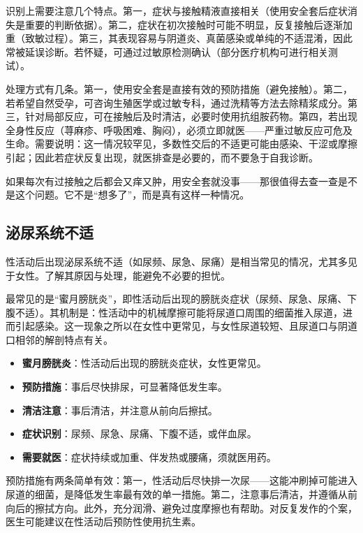 \documentclass[12pt,UTF8]{ctexbook}
\begin{document}
识别上需要注意几个特点。第一，症状与接触精液直接相关（使用安全套后症状消失是重要的判断依据）。第二，症状在初次接触时可能不明显，反复接触后逐渐加重（致敏过程）。第三，其表现容易与阴道炎、真菌感染或单纯的不适混淆，因此常被延误诊断。若怀疑，可通过过敏原检测确认（部分医疗机构可进行相关测试）。

处理方式有几条。第一，使用安全套是直接有效的预防措施（避免接触）。第二，若希望自然受孕，可咨询生殖医学或过敏专科，通过洗精等方法去除精浆成分。第三，针对局部反应，可在接触后及时清洁，必要时使用抗组胺药物。第四，若出现全身性反应（荨麻疹、呼吸困难、胸闷），必须立即就医——严重过敏反应可危及生命。需要说明：这一情况较罕见，多数性交后的不适更可能由感染、干涩或摩擦引起；因此若症状反复出现，就医排查是必要的，而不要急于自我诊断。

\begin{tcolorbox}[colback=pink!5!white,colframe=red!50!black,title=贴心小叮咛]
	如果每次有过接触之后都会又痒又肿，用安全套就没事——那很值得去查一查是不是这个问题。它不是“想多了”，而是真有这样一种情况。
\end{tcolorbox}

\subsection{泌尿系统不适}

性活动后出现泌尿系统不适（如尿频、尿急、尿痛）是相当常见的情况，尤其多见于女性。了解其原因与处理，能避免不必要的担忧。

最常见的是“蜜月膀胱炎”，即性活动后出现的膀胱炎症状（尿频、尿急、尿痛、下腹不适）。其机制是：性活动中的机械摩擦可能将尿道口周围的细菌推入尿道，进而引起感染。这一现象之所以在女性中更常见，与女性尿道较短、且尿道口与阴道口相邻的解剖特点有关。

\begin{itemize}
	\item \textbf{蜜月膀胱炎}：性活动后出现的膀胱炎症状，女性更常见。
	\item \textbf{预防措施}：事后尽快排尿，可显著降低发生率。
	\item \textbf{清洁注意}：事后清洁，并注意从前向后擦拭。
	\item \textbf{症状识别}：尿频、尿急、尿痛、下腹不适，或伴血尿。
	\item \textbf{需要就医}：症状持续或加重、伴发热或腰痛，须就医用药。
\end{itemize}

预防措施有两条简单有效：第一，性活动后尽快排一次尿——这能冲刷掉可能进入尿道的细菌，是降低发生率最有效的单一措施。第二，注意事后清洁，并遵循从前向后的擦拭方向。此外，充分润滑、避免过度摩擦也有帮助。对反复发作的个案，医生可能建议在性活动后预防性使用抗生素。
\end{document}
